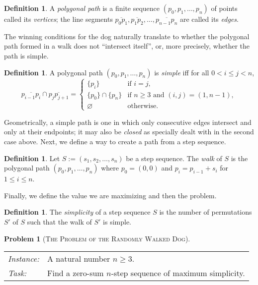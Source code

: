 \documentclass{amsart}
\renewcommand{\emptyset}{\varnothing}
\theoremstyle{definition}
\newtheorem{definition}[proposition]{Definition}
\theoremstyle{problem}
\newtheorem{problem}[proposition]{Problem}
\theoremstyle{remark}
\begin{document}
\begin{definition}
    A \emph{polygonal path} is a finite sequence $(p_0,p_1,\dots,p_n)$
    of points called its \emph{vertices}; the line segments
    $\overline{p_0p_1},\overline{p_1p_2},\dots,\overline{p_{n-1}p_n}$
    are called its \emph{edges}.
\end{definition}

The winning conditions for the dog naturally translate to whether the polygonal
path formed in a walk does not ``intersect itself'',
or, more precisely, whether the path is simple.

\begin{definition}
    A polygonal path $(p_0,p_1,\dots,p_n)$ is \emph{simple}
    iff for all $0<i\le j<n$,
    \[
        \overline{p_{i-1}p_i}\cap\overline{p_jp_{j+1}}=
        \begin{cases}
            \{p_i\}            & \text{if $i=j$},                       \\
            \{p_0\}\cap\{p_n\} & \text{if $n\ge3$ and $(i,j)=(1,n-1)$}, \\
            \emptyset          & \text{otherwise}.
        \end{cases}
    \]
\end{definition}

Geometrically, a simple path is one in which only consecutive
edges intersect and only at their endpoints; it may also
be \emph{closed} as specially dealt with in the second case above.
Next, we define a way to create a path from a step sequence.

\begin{definition}
    Let $S:=(s_1,s_2,\dots,s_n)$ be a step sequence. The \emph{walk} of $S$
    is the polygonal path $(p_0,p_1,\dots,p_n)$
    where $p_0=(0,0)$ and $p_i=p_{i-1}+s_i$ for $1\le i\le n$.
\end{definition}

Finally, we define the value we are maximizing and then the problem.

\begin{definition}
    The \emph{simplicity} of a step sequence $S$
    is the number of permutations $S'$ of $S$
    such that the walk of $S'$ is simple.
\end{definition}

\begin{problem}[\textsc{The Problem of the Randomly Walked Dog}]
\label{prob:rwd}
\begin{framed}
    \begin{tabular}{@{}ll}
        \textit{Instance:} &
        A natural number $n\ge3$. \\

        \textit{Task:}     &
        Find a zero-sum $n$-step sequence of maximum simplicity.
    \end{tabular}
    \vskip -2pt
\end{framed}
\end{problem}
\end{document}
